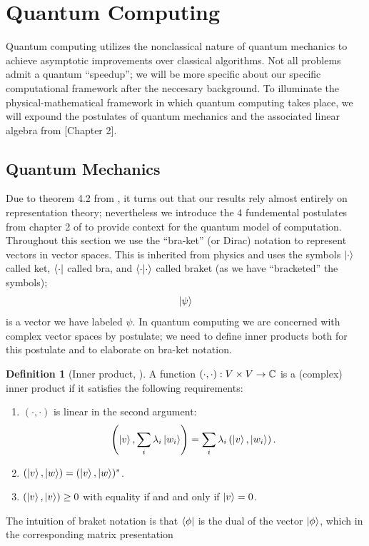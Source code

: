 \documentclass[12pt,twoside]{reedthesis}
\theoremstyle{plain}   %
\theoremstyle{definition}
\newtheorem{defn}{Definition}[section]
\theoremstyle{remark}
\numberwithin{equation}{section}
\begin{document}
  \section{Quantum Computing}
  Quantum computing utilizes the nonclassical nature of quantum mechanics to achieve asymptotic improvements over classical algorithms.
  Not all problems admit a quantum ``speedup''; we will be more specific about our specific computational framework after the neccesary background.
  To illuminate the physical-mathematical framework in which quantum computing takes place, we will expound the postulates of quantum mechanics and the associated linear algebra from \cite{nielsen2010}[Chapter 2].
  \subsection{Quantum Mechanics}
  Due to theorem 4.2 from \cite{copeland}, it turns out that our results rely almost entirely on representation theory;
  nevertheless we introduce the 4 fundemental postulates from chapter 2 of \cite{nielsen2010} to provide context for the quantum model of computation.
  Throughout this section we use the ``bra-ket'' (or Dirac) notation to represent vectors in vector spaces. This is inherited from physics and uses the symbols
  $\ket{\cdot}$ called ket, $\bra{\cdot}$ called bra, and $\braket{\cdot | \cdot}$ called braket (as we have ``bracketed'' the symbols); 
  \[ \ket{\psi} \]
  is a vector we have labeled $\psi$. In quantum computing we are concerned with complex vector spaces by postulate; we need to define inner products both for this postulate and to elaborate on bra-ket notation.
  \begin{defn}[{Inner product, \cite[2.1.4]{nielsen2010}}]
    A function $(\cdot, \cdot): V \times V \to \mathbb{C}$ is a (complex) inner product if it satisfies the following requirements:
    \begin{enumerate}
    \item $(\cdot, \cdot)$ is linear in the second argument:
      \[ \left( \ket{v}, \sum_i \lambda_i \ket{w_i} \right) = \sum_i \lambda_i \left( \ket{v}, \ket{w_i} \right).\]
    \item $(\ket{v}, \ket{w}) = (\ket{v}, \ket{w})^*$.
    \item $(\ket{v}, \ket{v}) \geq 0$ with equality if and and only if $\ket{v} = 0$.
    \end{enumerate}
  \end{defn}
  The intuition of braket notation is that $\bra{\phi}$ is the dual of the vector $\ket{\phi}$, which in the corresponding matrix presentation
\end{document}
